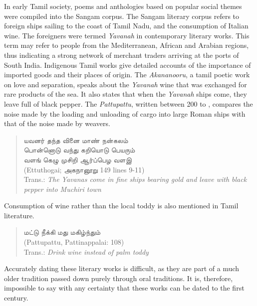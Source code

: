 In early Tamil society, poems and anthologies based on popular social themes were compiled into the Sangam corpus. The Sangam literary corpus refers to foreign ships sailing to the coast of Tamil Nadu, and the consumption of Italian wine. The foreigners were termed \emph{Yavanah} in contemporary literary works. This term may refer to people from the Mediterranean, African and Arabian regions, thus indicating a strong network of merchant traders arriving at the ports of South India. Indigenous Tamil works give detailed accounts of the importance of imported goods and their places of origin. The \emph{Akananooru}, a tamil poetic work on love and separation, speaks about the \emph{Yavanah} wine that was exchanged for rare products of the sea. It also states that when the \emph{Yavanah} ships come, they leave full of black pepper. The \emph{Pattupattu}, written between 200 \BC to \parencite[][231]{thapar2002}, compares the noise made by the loading and unloading of cargo into large Roman ships with that of the noise made by weavers.

\begin{quote}
{\tamilfont
யவனர் தந்த வினை மாண் நன்கலம்\\
பொன்னொடு வந்து கறியொடு பெயரும்\\
வளங் கெழு முசிறி ஆர்ப்பெழ வளஇ}\\[.5em]
(Ettuthogai; {\tamilfont அகநானூறு} 149 lines  9-11)\\
Trans.: \emph{The Yavanas come in fine ships bearing gold and leave with black pepper into Muchiri town}
\end{quote}

Consumption of wine rather than the local toddy is also mentioned in Tamil literature.
\begin{quote}
{{\tamilfont மட்டு நீக்கி மது மகிழ்ந்தும்}}\\[.5em]
(Pattupattu, Pattinappalai: 108)\\
Trans.: \emph{Drink wine instead of palm toddy}
\end{quote}
Accurately dating these literary works is difficult, as they are part of a much older tradition passed down purely through oral traditions. It is, therefore, impossible to say with any certainty that these works can be dated to the first century\AD.

